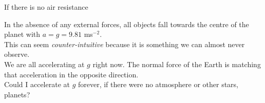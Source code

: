 %
%
%
%
%
%






\begin{frame}{If there is no air resistance}

In the absence of any external forces, all objects fall towards the centre of the planet with $a = g =9.81$ ms$^{-2}$.\\[1ex]

This can seem \textit{counter-intuitive} because it is something we can almost never observe.\\[1ex]

We are all accelerating at $g$ right now. The normal force of the Earth is matching that acceleration in the opposite direction.\\[1ex]

Could I accelerate at $g$ forever, if there were no atmosphere or other stars, planets?\\[1ex]


\end{frame}



